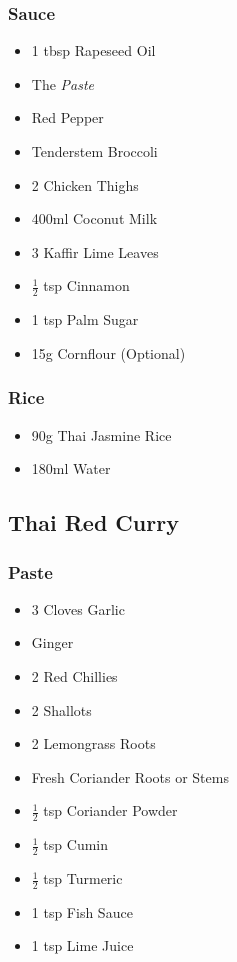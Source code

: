\documentclass[11pt, english]{article}
\begin{document}
                \subsubsection*{Sauce}

        \begin{itemize}
        \setlength\itemsep{0cm}
                \item 1 tbsp Rapeseed Oil
                \item The \textit{Paste}
                \item Red Pepper
		\item Tenderstem Broccoli
                \item 2 Chicken Thighs
                \item 400ml Coconut Milk
                \item 3 Kaffir Lime Leaves
		\item $\frac{1}{2}$ tsp Cinnamon
		\item 1 tsp Palm Sugar
		\item 15g Cornflour (Optional)
        \end{itemize}

                \subsubsection*{Rice}

        \begin{itemize}
        \setlength\itemsep{0cm}
                \item 90g Thai Jasmine Rice
                \item 180ml Water
        \end{itemize}

\newpage

	\subsection{Thai Red Curry}

		\subsubsection*{Paste}

	\begin{itemize}
        \setlength\itemsep{0cm}
		\item 3 Cloves Garlic
                \item Ginger
                \item 2 Red Chillies
                \item 2 Shallots
                \item 2 Lemongrass Roots
                \item Fresh Coriander Roots or Stems
		\item $\frac{1}{2}$ tsp Coriander Powder
                \item $\frac{1}{2}$ tsp Cumin
		\item $\frac{1}{2}$ tsp Turmeric
                \item 1 tsp Fish Sauce
                \item 1 tsp Lime Juice
        \end{itemize}
\end{document}
